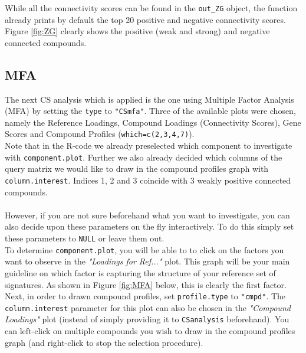 \documentclass[a4paper]{article}\usepackage[]{graphicx}\usepackage[]{color}
\begin{document}
\noindent While all the connectivity scores can be found in the \texttt{out\_ZG}
object, the function already prints by default the top 20 positive and negative
connectivity scores. Figure \ref{fig:ZG} clearly shows the positive (weak and
strong) and negative connected compounds.

\subsection{MFA}
The next CS analysis which is applied is the one using Multiple Factor Analysis
(MFA) by setting the \texttt{type} to \texttt{"CSmfa"}. Three of the
available plots were chosen, namely the Reference Loadings,
Compound Loadings (Connectivity Scores), Gene Scores and Compound Profiles
(\texttt{which=c(2,3,4,7)}).\\
Note that in the R-code we already preselected which component to investigate
with \texttt{component.plot}.
Further we also already decided which columns of the query matrix we would like
to draw in the compound profiles graph with \texttt{column.interest}. Indices 1, 2 and 3 coincide
with 3 weakly positive connected compounds.\\ \\
However, if you are not sure beforehand what you want to investigate, you can
also decide upon these parameters on the fly interactively. To do this simply
set these parameters to \texttt{NULL} or leave them out.\\
To determine \texttt{component.plot}, you will be able to to click on the
factors you want to observe in the {\it "Loadings for Ref..."} plot. This graph will be
your main guideline on which factor is capturing the structure of your reference
set of signatures. As shown in Figure \ref{fig:MFA} below, this is clearly the
first factor. \\
Next, in order to drawn compound profiles, set \texttt{profile.type} to
\texttt{"cmpd"}. The \texttt{column.interest} parameter for this plot can also
be chosen in the {\it "Compound Loadings"} plot (instead of simply providing it
to \texttt{CSanalysis} beforehand). You can left-click on multiple compounds you wish to draw in the compound profiles graph (and right-click to stop the selection procedure). 
\end{document}
